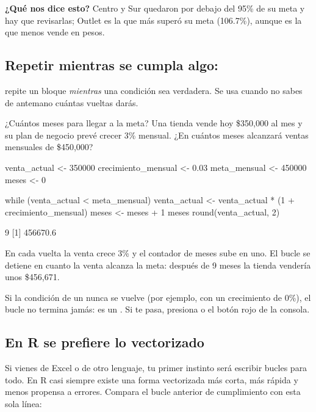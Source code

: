 \textbf{¿Qué nos dice esto?} Centro y Sur quedaron por debajo del 95\% de
su meta y hay que revisarlas; Outlet es la que más superó su meta
(106.7\%), aunque es la que menos vende en pesos.

\subsection{Repetir mientras se cumpla algo: \texorpdfstring{}{while}}

 repite un bloque \emph{mientras} una condición sea
verdadera. Se usa cuando no sabes de antemano cuántas vueltas darás.

\begin{ejemplo}{¿Cuántos meses para llegar a la meta?}
Una tienda vende hoy \$350,000 al mes y su plan de negocio prevé crecer 3\%
mensual. ¿En cuántos meses alcanzará ventas mensuales de \$450,000?
\end{ejemplo}

\begin{rcode}
venta_actual <- 350000
crecimiento_mensual <- 0.03
meta_mensual <- 450000
meses <- 0

while (venta_actual < meta_mensual) {
  venta_actual <- venta_actual * (1 + crecimiento_mensual)
  meses <- meses + 1
}
meses
round(venta_actual, 2)
\end{rcode}
\begin{rsalida}
[1] 9
[1] 456670.6
\end{rsalida}

En cada vuelta la venta crece 3\% y el contador de meses sube en uno. El
bucle se detiene en cuanto la venta alcanza la meta: después de 9 meses la
tienda vendería unos \$456,671.

\begin{advertencia}
Si la condición de un  nunca se vuelve  (por
ejemplo, con un crecimiento de 0\%), el bucle no termina jamás: es un
. Si te pasa, presiona  o el botón rojo
 de la consola.
\end{advertencia}

\subsection{En R se prefiere lo vectorizado}

Si vienes de Excel o de otro lenguaje, tu primer instinto será escribir
bucles para todo. En R casi siempre existe una forma vectorizada más corta,
más rápida y menos propensa a errores. Compara el bucle anterior de
cumplimiento con esta sola línea:

